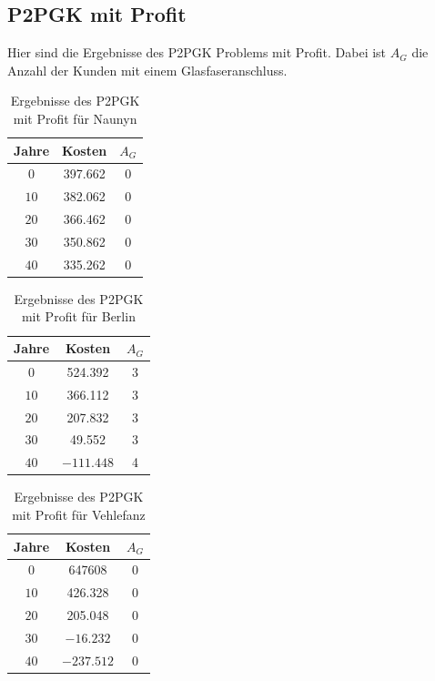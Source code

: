 \documentclass[11pt,a4paper]{article}
\theoremstyle{my_th_style1}
\begin{document}
\subsection*{P2PGK mit Profit}
Hier sind die Ergebnisse des P2PGK Problems mit Profit. Dabei ist $A_G$ die Anzahl der Kunden mit einem Glasfaseranschluss.

\begin{table}[!htbp]
	\centering
	\begin{tabular}{c|c|c}
		\centering
		Jahre & Kosten & $A_G$ \\	
		\hline
		$0$   	 &  397.662& 0  \\
		$10$ 	&  382.062 & 0  \\
		$20$   	&  366.462  & 0  \\
		$30$    &  350.862 & 0  \\
		$40$    &  335.262  & 0 \\
	\end{tabular}
	\caption{Ergebnisse des P2PGK mit Profit f\"ur Naunyn}
	\label{P2PGKProfitN}
\end{table}

\begin{table}[!htbp]
	\centering
	\begin{tabular}{c|c|c}
		\centering
		Jahre & Kosten & $A_G$ \\	
		\hline
		$0$   	 &  524.392 & 3  \\
		$10$ 	&   366.112& 3  \\
		$20$   	&   207.832 & 3  \\
		$30$    &   49.552 & 3  \\
		$40$    & $-111.448$ & 4 \\
	\end{tabular}
	\caption{Ergebnisse des P2PGK mit Profit f\"ur Berlin} 
	\label{P2PGKProfitB}
\end{table}

\begin{table}[!htbp]
	\centering
	\begin{tabular}{c|c|c}
		\centering
		Jahre & Kosten & $A_G$ \\	
		\hline
		$0$   	 & 647608  &0  \\
		$10$ 	&  426.328 & 0  \\
		$20$   	&  205.048  & 0  \\
		$30$    & $-16.232$& 0  \\
		$40$    &  $-237.512$ & 0 \\
	\end{tabular}
	\caption{Ergebnisse des P2PGK mit Profit f\"ur Vehlefanz}
	\label{P2PGKProfitV}
\end{table}
\end{document}
